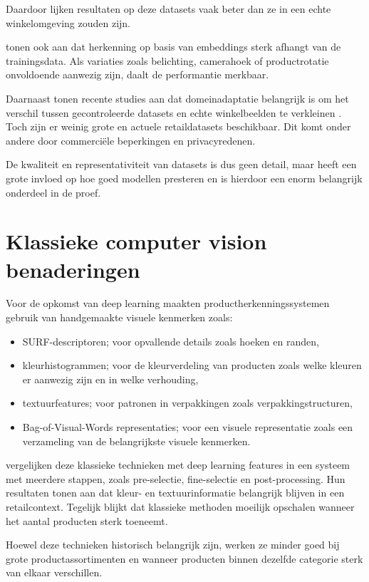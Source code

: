 Daardoor lijken resultaten op deze datasets vaak beter dan ze in een echte winkelomgeving zouden zijn.

\textcite{TONIONI201810733} tonen ook aan dat herkenning op basis van embeddings sterk afhangt van de trainingsdata. Als variaties zoals belichting, camerahoek of productrotatie onvoldoende aanwezig zijn, daalt de performantie merkbaar.

Daarnaast tonen recente studies aan dat domeinadaptatie belangrijk is om het verschil tussen gecontroleerde datasets en echte winkelbeelden te verkleinen \autocite{wei2020retail}. Toch zijn er weinig grote en actuele retaildatasets beschikbaar. Dit komt onder andere door commerciële beperkingen en privacyredenen.

De kwaliteit en representativiteit van datasets is dus geen detail, maar heeft een grote invloed op hoe goed modellen presteren en is hierdoor een enorm belangrijk onderdeel in de proef.

\section{Klassieke computer vision benaderingen}

Voor de opkomst van deep learning maakten productherkenningssystemen gebruik van handgemaakte visuele kenmerken zoals:
\begin{itemize}
\item SURF-descriptoren; voor opvallende details zoals hoeken en randen,
\item kleurhistogrammen; voor de kleurverdeling van producten zoals welke kleuren er aanwezig zijn en in welke verhouding,
\item textuurfeatures; voor patronen in verpakkingen zoals verpakkingstructuren,
\item Bag-of-Visual-Words representaties; voor een visuele representatie zoals een verzameling van de belangrijkste visuele kenmerken.
\end{itemize}

\textcite{FRANCO2017163} vergelijken deze klassieke technieken met deep learning features in een systeem met meerdere stappen, zoals pre-selectie, fine-selectie en post-processing. Hun resultaten tonen aan dat kleur- en textuurinformatie belangrijk blijven in een retailcontext. Tegelijk blijkt dat klassieke methoden moeilijk opschalen wanneer het aantal producten sterk toeneemt.

Hoewel deze technieken historisch belangrijk zijn, werken ze minder goed bij grote productassortimenten en wanneer producten binnen dezelfde categorie sterk van elkaar verschillen.

